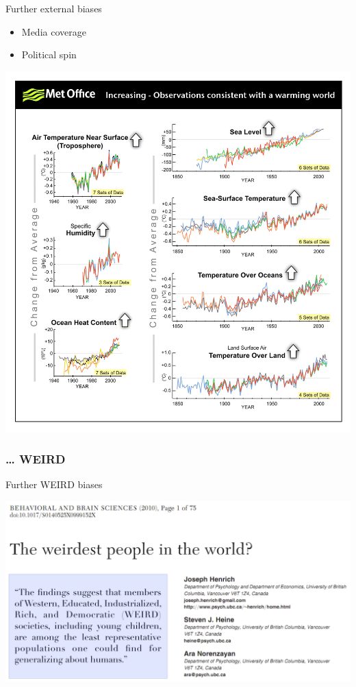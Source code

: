 \documentclass{beamer}
\begin{document}
	\begin{frame}[t]{Further external biases}

		\begin{itemize}
			\item Media coverage
			\item Political spin		
		\end{itemize}	
				
		\href{//}{\includegraphics[width=\textwidth]{images/warming.jpg}}
			
	\end{frame}
	
	\subsubsection{… WEIRD}
	
	\begin{frame}[t]{Further WEIRD biases}
		
		\href{http://www2.psych.ubc.ca/~henrich/pdfs/WeirdPeople.pdf}{\includegraphics[width=\textwidth]{images/bbs.pdf}}	
	\end{frame}
\end{document}

